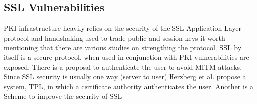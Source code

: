\documentclass[10pt,twocolumn,pdftex]{article}
\begin{document}
\subsection{SSL Vulnerabilities}

PKI infrastructure heavily relies on the security of the SSL Application Layer protocol and handshaking used to trade public and session keys it worth mentioning that there are various studies on strengthing the protocol. SSL by itself is a secure protocol, when used in conjunction with PKI vulnerabilities are exposed. There is a proposal to authenticate the user to avoid MITM attacks. Since SSL security is usually one way (server to user) Herzberg et al. propose a system, TPL, in which a certificate authority authenticates the user. \cite{herzberg2000access} Another is a Scheme to improve the security of SSL - \cite{huawei2009scheme}\cite{soghoian2012certified}



\newpage


\end{document}
